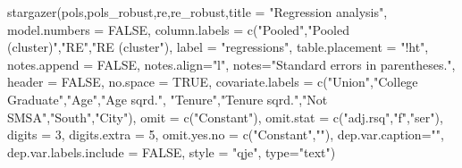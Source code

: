 \documentclass[
]{article}
\newenvironment{Shaded}{\begin{snugshade}}{\end{snugshade}}
\newcommand{\AttributeTok}[1]{\textcolor[rgb]{0.77,0.63,0.00}{#1}}
\newcommand{\ConstantTok}[1]{\textcolor[rgb]{0.00,0.00,0.00}{#1}}
\newcommand{\DecValTok}[1]{\textcolor[rgb]{0.00,0.00,0.81}{#1}}
\newcommand{\FunctionTok}[1]{\textcolor[rgb]{0.00,0.00,0.00}{#1}}
\newcommand{\NormalTok}[1]{#1}
\newcommand{\StringTok}[1]{\textcolor[rgb]{0.31,0.60,0.02}{#1}}
\begin{document}
\begin{Shaded}
\begin{Highlighting}[]
  \FunctionTok{stargazer}\NormalTok{(pols,pols\_robust,re,re\_robust,}\AttributeTok{title =} \StringTok{"Regression analysis"}\NormalTok{, }
            \AttributeTok{model.numbers =} \ConstantTok{FALSE}\NormalTok{,}
            \AttributeTok{column.labels =} \FunctionTok{c}\NormalTok{(}\StringTok{"Pooled"}\NormalTok{,}\StringTok{"Pooled (cluster)"}\NormalTok{,}\StringTok{"RE"}\NormalTok{,}\StringTok{"RE (cluster"}\NormalTok{),}
            \AttributeTok{label =} \StringTok{"regressions"}\NormalTok{,}
            \AttributeTok{table.placement =} \StringTok{"!ht"}\NormalTok{,}
            \AttributeTok{notes.append =} \ConstantTok{FALSE}\NormalTok{,}
            \AttributeTok{notes.align=}\StringTok{"l"}\NormalTok{,}
            \AttributeTok{notes=}\StringTok{"Standard errors in parentheses."}\NormalTok{,}
            \AttributeTok{header =} \ConstantTok{FALSE}\NormalTok{,}
            \AttributeTok{no.space =} \ConstantTok{TRUE}\NormalTok{,}
            \AttributeTok{covariate.labels =} \FunctionTok{c}\NormalTok{(}\StringTok{"Union"}\NormalTok{,}\StringTok{"College Graduate"}\NormalTok{,}\StringTok{"Age"}\NormalTok{,}\StringTok{"Age sqrd."}\NormalTok{,}
                                 \StringTok{"Tenure"}\NormalTok{,}\StringTok{"Tenure sqrd."}\NormalTok{,}\StringTok{"Not SMSA"}\NormalTok{,}\StringTok{"South"}\NormalTok{,}\StringTok{"City"}\NormalTok{),}
            \AttributeTok{omit =} \FunctionTok{c}\NormalTok{(}\StringTok{"Constant"}\NormalTok{),}
            \AttributeTok{omit.stat =} \FunctionTok{c}\NormalTok{(}\StringTok{"adj.rsq"}\NormalTok{,}\StringTok{"f"}\NormalTok{,}\StringTok{"ser"}\NormalTok{),}
            \AttributeTok{digits =} \DecValTok{3}\NormalTok{,}
            \AttributeTok{digits.extra =} \DecValTok{5}\NormalTok{,}
            \AttributeTok{omit.yes.no =} \FunctionTok{c}\NormalTok{(}\StringTok{"Constant"}\NormalTok{,}\StringTok{""}\NormalTok{),}
            \AttributeTok{dep.var.caption=}\StringTok{""}\NormalTok{,}
            \AttributeTok{dep.var.labels.include =} \ConstantTok{FALSE}\NormalTok{,}
            \AttributeTok{style =} \StringTok{"qje"}\NormalTok{,}
            \AttributeTok{type=}\StringTok{"text"}\NormalTok{)}
\end{Highlighting}
\end{Shaded}
\end{document}
